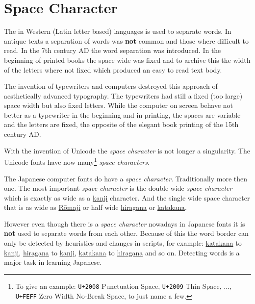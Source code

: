 \section{Space Character}
\label{sec:SpaceCharacter}

The  in Western
(Latin letter based) languages is used to separate words. In antique texts a
separation of words was \textbf{not} common and those where difficult to read.
In the 7th century AD the word separation was introduced. In the beginning of
printed books the space wide was fixed and to archive this the width of the
letters where not fixed which produced an easy to read text body.

The invention of typewriters and computers destroyed this approach of
aesthetically advanced typography. The typewriters had still a fixed (too
large) space width but also fixed letters. While the computer on screen behave
not better as a typewriter in the beginning and in printing, the spaces are
variable and the letters are fixed, the opposite of the elegant book printing
of the 15th century AD.

With the invention of Unicode the \textit{space character} is not longer a
singularity.  The Unicode fonts have now many\footnote{To give an example:
        \texttt{U+2008} Punctuation Space, \texttt{U+2009} Thin Space, ...,
        \texttt{U+FEFF} Zero Width No-Break Space, to just name a few.}
        \textit{space characters}.

The Japanese computer fonts do have a \textit{space character}. Traditionally
more then one.  The most important \textit{space character} is the double wide
\textit{space character} which is exactly as wide as a
\hyperref[sec:Kanji]{kanji} character. And the single wide space character that
is as wide as \hyperref[sec:Romaji]{Rōmaji} or half wide
\hyperref[sec:Hiragana]{hiragana} or \hyperref[sec:Katakana]{katakana}.

However even though there is a \textit{space character} nowadays in Japanese
fonts it is \textbf{not} used to separate words from each other. Because of
this the word border can only be detected by heuristics and changes in scripts,
for example: \hyperref[sec:Katakana]{katakana} to \hyperref[sec:Kanji]{kanji},
\hyperref[sec:Hiragana]{hiragana} to \hyperref[sec:Kanji]{kanji},
\hyperref[sec:Katakana]{katakana} to \hyperref[sec:Hiragana]{hiragana} and so
on. Detecting words is a major task in learning Japanese.

